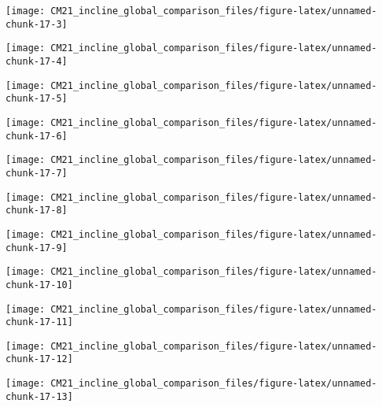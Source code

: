 \documentclass[
  10pt,
  a4paper,oneside]{article}
\begin{document}
\begin{center}\texttt{[image: CM21\_incline\_global\_comparison\_files/figure-latex/unnamed-chunk-17-3]} \end{center}

\begin{center}\texttt{[image: CM21\_incline\_global\_comparison\_files/figure-latex/unnamed-chunk-17-4]} \end{center}

\begin{center}\texttt{[image: CM21\_incline\_global\_comparison\_files/figure-latex/unnamed-chunk-17-5]} \end{center}

\begin{center}\texttt{[image: CM21\_incline\_global\_comparison\_files/figure-latex/unnamed-chunk-17-6]} \end{center}

\begin{center}\texttt{[image: CM21\_incline\_global\_comparison\_files/figure-latex/unnamed-chunk-17-7]} \end{center}

\begin{center}\texttt{[image: CM21\_incline\_global\_comparison\_files/figure-latex/unnamed-chunk-17-8]} \end{center}

\begin{center}\texttt{[image: CM21\_incline\_global\_comparison\_files/figure-latex/unnamed-chunk-17-9]} \end{center}

\begin{center}\texttt{[image: CM21\_incline\_global\_comparison\_files/figure-latex/unnamed-chunk-17-10]} \end{center}

\begin{center}\texttt{[image: CM21\_incline\_global\_comparison\_files/figure-latex/unnamed-chunk-17-11]} \end{center}

\begin{center}\texttt{[image: CM21\_incline\_global\_comparison\_files/figure-latex/unnamed-chunk-17-12]} \end{center}

\begin{center}\texttt{[image: CM21\_incline\_global\_comparison\_files/figure-latex/unnamed-chunk-17-13]} \end{center}
\end{document}
